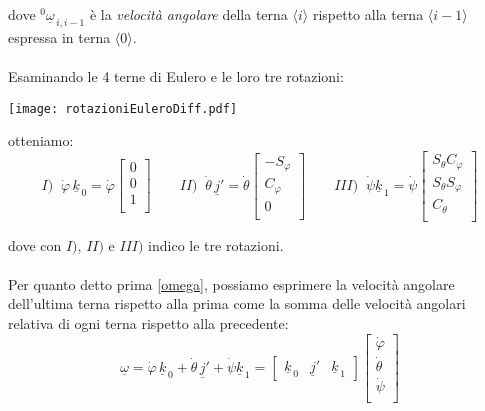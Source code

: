 dove $^0\underline{\omega}_{\,i,i-1}$ è la \emph{velocità angolare} della terna $\langle i \rangle$ rispetto alla terna $\langle i-1 \rangle$ espressa in terna $\langle 0 \rangle$.

\paragraph{}
Esaminando le 4 terne di Eulero e le loro tre rotazioni:

\begin{center}
\texttt{[image: rotazioniEuleroDiff.pdf]}
\end{center}

otteniamo:
\begin{equation*}
I)\;\;\dot{\varphi}\,\underline{k}_{\,0} = \dot{\varphi}
\begin{bmatrix}
	0 \\
	0 \\
	1 \\
\end{bmatrix}
\qquad
II)\;\;\dot{\theta}\,\underline{j}' = \dot{\theta}
\begin{bmatrix}
	- S_{\varphi} \\
	C_{\varphi} \\
	0 \\
\end{bmatrix}
\qquad
III)\;\;\dot{\psi}\underline{k}_{\,1} = 
\dot{\psi}
\begin{bmatrix}
	S_{\theta}C_{\varphi} \\
	S_{\theta}S_{\varphi} \\
	C_{\theta} \\
\end{bmatrix}
\end{equation*}

dove con $I)$, $II)$ e $III)$ indico le tre rotazioni.
\paragraph{}
Per quanto detto prima \eqref{omega}, possiamo esprimere la velocità angolare dell'ultima terna rispetto alla prima come la somma delle velocità angolari relativa di ogni terna rispetto alla precedente:
\begin{equation}
	\underline{\omega}=\dot{\varphi}\,\underline{k}_{\,0} + \dot{\theta}\,\underline{j}' + \dot{\psi}\underline{k}_{\,1} = 
	\begin{bmatrix}
		\underline{k}_{\,0} & \underline{j}' & \underline{k}_{\,1}
	\end{bmatrix}
	\begin{bmatrix}
		\dot{\varphi} \\
		\dot{\theta} \\
		\dot{\psi} \\
	\end{bmatrix}
\end{equation}

